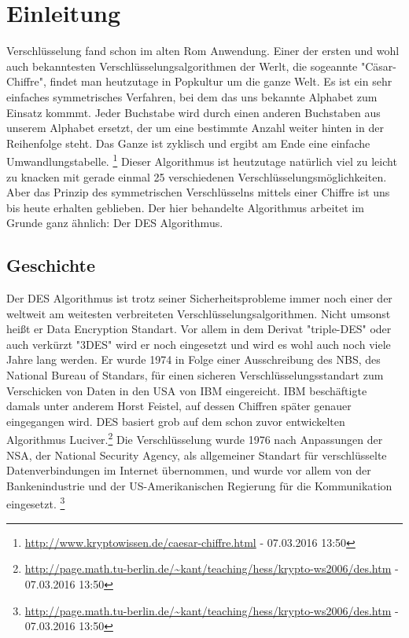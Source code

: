 \documentclass[
10pt, %
a4paper, %
oneside, %
headinclude,footinclude, %
BCOR5mm, %
]{scrartcl}
\begin{document}
\section{Einleitung}  
Verschlüsselung fand schon im alten Rom Anwendung. Einer der ersten und wohl auch bekanntesten Verschlüsselungsalgorithmen der Werlt, die sogeannte "Cäsar-Chiffre", findet man heutzutage in Popkultur um die ganze Welt. Es ist ein sehr einfaches symmetrisches Verfahren, bei dem das uns bekannte Alphabet zum Einsatz kommmt. Jeder Buchstabe wird durch einen anderen Buchstaben aus unserem Alphabet ersetzt, der um eine bestimmte Anzahl weiter hinten in der Reihenfolge steht. Das Ganze ist zyklisch und ergibt am Ende eine einfache Umwandlungstabelle. \footnote{\url{http://www.kryptowissen.de/caesar-chiffre.html} - 07.03.2016 13:50} Dieser Algorithmus ist heutzutage natürlich viel zu leicht zu knacken mit gerade einmal 25 verschiedenen Verschlüsselungsmöglichkeiten. Aber das Prinzip des symmetrischen Verschlüsselns mittels einer Chiffre ist uns bis heute erhalten geblieben. Der hier behandelte Algorithmus arbeitet im Grunde ganz ähnlich: Der DES Algorithmus.

\subsection{Geschichte} 
Der DES Algorithmus ist trotz seiner Sicherheitsprobleme immer noch einer der weltweit am weitesten verbreiteten Verschlüsselungsalgorithmen. Nicht umsonst heißt er Data Encryption Standart. Vor allem in dem Derivat "triple-DES" oder auch verkürzt "3DES" wird er noch eingesetzt und wird es wohl auch noch viele Jahre lang werden. Er wurde 1974 in Folge einer Ausschreibung des NBS, des National Bureau of Standars,  für einen sicheren Verschlüsselungsstandart zum Verschicken von Daten in den USA von IBM eingereicht. IBM beschäftigte damals unter anderem Horst Feistel, auf dessen Chiffren später genauer eingegangen wird. DES basiert grob auf dem schon zuvor entwickelten Algorithmus Luciver.\footnote{\url{http://page.math.tu-berlin.de/~kant/teaching/hess/krypto-ws2006/des.htm} - 07.03.2016 13:50} Die Verschlüsselung wurde 1976 nach Anpassungen der NSA, der National Security Agency, als allgemeiner Standart für verschlüsselte Datenverbindungen im Internet übernommen, und wurde vor allem von der Bankenindustrie und der US-Amerikanischen Regierung für die Kommunikation eingesetzt. \footnote{\url{http://page.math.tu-berlin.de/~kant/teaching/hess/krypto-ws2006/des.htm} - 07.03.2016 13:50}
 
\end{document}

